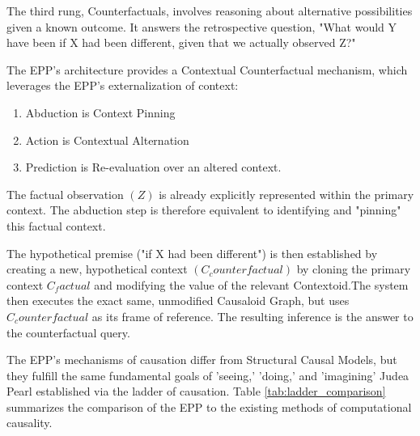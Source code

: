 The third rung, Counterfactuals, involves reasoning about alternative possibilities given a known outcome. It answers the retrospective question, "What would Y have been if X had been different, given that we actually observed Z?"

The EPP's architecture provides a Contextual Counterfactual mechanism, which leverages the EPP's externalization of context:

\begin{enumerate}
    \item Abduction is Context Pinning
    \item Action is Contextual Alternation
    \item Prediction is Re-evaluation over an altered context.
\end{enumerate}

The factual observation $(Z)$ is already explicitly represented within the primary context.
The abduction step is therefore equivalent to identifying and "pinning" this factual context.

The hypothetical premise ("if X had been different") is then established by creating a new, hypothetical context $(C_counterfactual)$ by cloning the primary context $C_factual$ and modifying the value of the relevant Contextoid.The system then executes the exact same, unmodified Causaloid Graph, but uses $C_counterfactual$ as its frame of reference. The resulting inference is the answer to the counterfactual query.

\newpage

The EPP's mechanisms of causation differ from Structural Causal Models,
but they fulfill the same fundamental goals of 'seeing,' 'doing,' and 'imagining' Judea Pearl established
via the ladder of causation. Table \ref{tab:ladder_comparison} summarizes the comparison of the EPP to the existing methods of computational causality.


